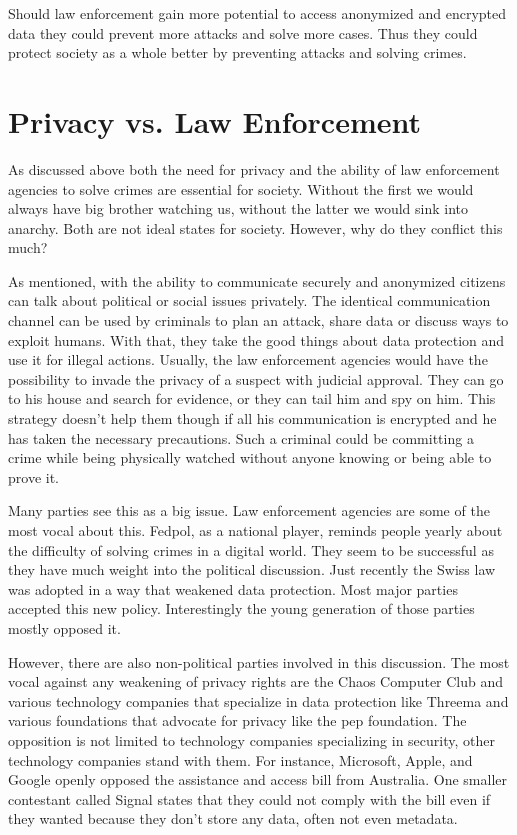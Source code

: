 \documentclass[12pt]{article}
\begin{document}
Should law enforcement gain more potential to access anonymized and encrypted data they could prevent more attacks and solve more cases. Thus they could protect society as a whole better by preventing attacks and solving crimes. \cite{jabe2017}

\section*{Privacy vs. Law Enforcement}

As discussed above both the need for privacy and the ability of law enforcement agencies to solve crimes are essential for society. Without the first we would always have big brother watching us, without the latter we would sink into anarchy. Both are not ideal states for society. However, why do they conflict this much?

As mentioned, with the ability to communicate securely and anonymized citizens can talk about political or social issues privately. The identical communication channel can be used by criminals to plan an attack, share data or discuss ways to exploit humans. With that, they take the good things about data protection and use it for illegal actions. Usually, the law enforcement agencies would have the possibility to invade the privacy of a suspect with judicial approval. They can go to his house and search for evidence, or they can tail him and spy on him. This strategy doesn't help them though if all his communication is encrypted and he has taken the necessary precautions. Such a criminal could be committing a crime while being physically watched without anyone knowing or being able to prove it. 

Many parties see this as a big issue. Law enforcement agencies are some of the most vocal about this. Fedpol, as a national player, reminds people yearly about the difficulty of solving crimes in a digital world. \cite{jabe2017} They seem to be successful as they have much weight into the political discussion. Just recently the Swiss law was adopted in a way that weakened data protection. \cite{bupf} Most major parties accepted this new policy. Interestingly the young generation of those parties mostly opposed it. \cite{nzzBupfWho, nzzBupfWhat}

However, there are also non-political parties involved in this discussion. The most vocal against any weakening of privacy rights are the Chaos Computer Club and various technology companies that specialize in data protection like Threema and various foundations that advocate for privacy like the pep foundation. \cite{stopbupf}  The opposition is not limited to technology companies specializing in security, other technology companies stand with them. For instance, Microsoft, Apple, and Google openly opposed the assistance and access bill from Australia. \cite{australiaBig} One smaller contestant called Signal states that they could not comply with the bill even if they wanted because they don't store any data, often not even metadata. \cite{australiaSmall}
\end{document}
